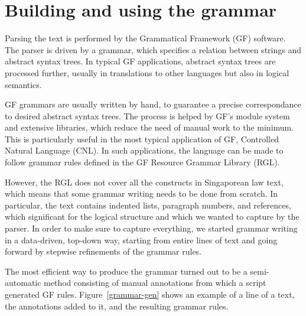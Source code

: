 \documentclass{IOS-Book-Article}
\begin{document}
\section{Building and using the grammar}

Parsing the text is performed by the Grammatical Framework (GF) software.
The parser is driven by a grammar, which specifies a relation between strings and abstract syntax trees.
In typical GF applications, abstract syntax trees are processed further, usually in translations to other languages but also in logical semantics. 

GF grammars are usually written by hand, to guarantee a precise correspondance to desired abstract syntax trees.
The process is helped by GF's module system and extensive libraries, which reduce the need of manual work to the minimum.
This is particularly useful in the most typical application of GF, Controlled Natural Language (CNL).
In such applications, the language can be made to follow grammar rules defined in the GF Resource Grammar Library (RGL).

However, the RGL does not cover all the constructs in Singaporean law text, which means that some grammar writing needs to be done from scratch.
In particular, the text contains indented lists, paragraph numbers, and references, which significant for the logical structure and which we wanted to capture by the parser.
In order to make sure to capture everything, we started grammar writing in a data-driven, top-down way, starting from entire lines of text and going forward by stepwise refinements of the grammar rules.

The most efficient way to produce the grammar turned out to be a semi-automatic method consisting of manual annotations from which a script generated GF rules.
Figure~\ref{grammar-gen} shows an example of a line of a text, the annotations added to it, and the resulting grammar rules.
\end{document}
